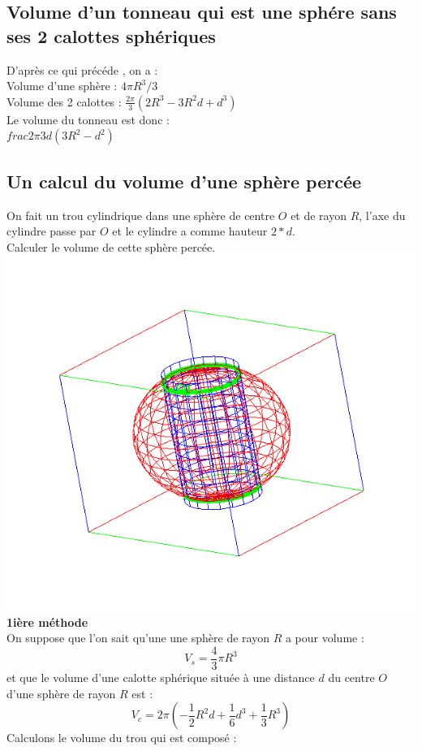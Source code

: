 \documentclass[a4paper,11pt]{book}
\begin{document}
\subsection{Volume d'un tonneau qui est une sph\'ere sans ses 2 calottes sph\'eriques}
D'apr\`es ce qui pr\'ec\'ede , on a :\\
Volume d'une sph\`ere : $4\pi R^3/3$\\
Volume des 2 calottes : $\frac{2\pi}{3}(2R^3-3R^2d+d^3)$\\
Le volume du tonneau est donc :\\
$frac{2\pi}{3}d(3R^2-d^2)$
\subsection{Un calcul du volume d'une sph\`ere perc\'ee}
On fait un trou cylindrique dans une sph\`ere de centre $O$ et de rayon $R$, 
l'axe du cylindre passe par $O$ et le  cylindre a comme hauteur $2*d$.\\
Calculer le volume de cette sph\`ere perc\'ee.\\
\includegraphics[width=\textwidth]{spheretrou}
{\bf 1i\`ere m\'ethode}\\
On suppose que l'on sait qu'une une sph\`ere de rayon $R$ a pour volume :
$$V_s=\frac{4}{3}\pi R^3$$ 
et que le volume d'une calotte sph\'erique situ\'ee \`a une distance $d$ du 
centre $O$ d'une sph\`ere de rayon $R$ est :
$$V_c=2\pi(-\frac{1}{2}R^2d+\frac{1}{6}d^3+\frac{1}{3}R^3)$$
Calculons le volume du trou qui est compos\'e :
\end{document}
